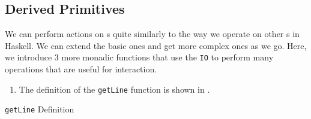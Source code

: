 \subsection{Derived Primitives}\label{subsec:Derived_Primitives}
We can perform actions on s quite similarly to the way we operate on other s in Haskell.
We can extend the basic ones and get more complex ones as we go.
Here, we introduce 3 more monadic functions that use the \texttt{IO}  to perform many operations that are useful for interaction.
\begin{enumerate}[noitemsep]
\item {}\label{act:IO_getLine}
  The definition of the \texttt{getLine} function is shown in .
\end{enumerate}

\begin{listing}[h!tbp]
\caption{\texttt{getLine} Definition}
\label{lst:IO_getLine_Definition}
\end{listing}


